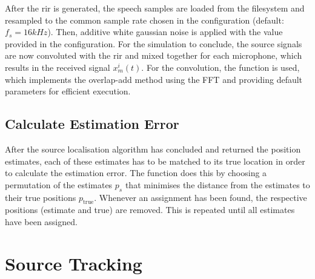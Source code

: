 After the \gls{rir} is generated, the speech samples are loaded from the filesystem and resampled to the common sample rate chosen in the configuration (default: $f_s=16kHz$). Then, additive white gaussian noise is applied with the  value provided in the configuration. For the simulation to conclude, the source signals are now convoluted with the \gls{rir} and mixed together for each microphone, which results in the received signal $x_m^i(t)$. For the convolution, the \matlab function  is used, which implements the overlap-add method using the FFT and providing default parameters for efficient execution.

\subsection{Calculate Estimation Error}
After the source localisation algorithm has concluded and returned the position estimates, each of these estimates has to be matched to its true location in order to calculate the estimation error. The function  does this by choosing a permutation of the estimates $p_s$ that minimises the distance from the estimates to their true positions $p_{\text{true}}$. Whenever an assignment has been found, the respective positions (estimate and true) are removed. This is repeated until all estimates have been assigned.

\section{Source Tracking}
